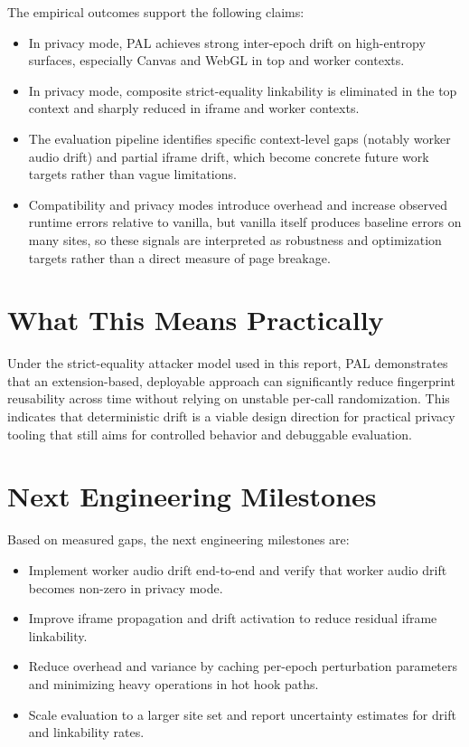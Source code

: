 \documentclass[11pt]{report}
\begin{document}
The empirical outcomes support the following claims:

\begin{itemize}
    \item In privacy mode, PAL achieves strong inter-epoch drift on high-entropy surfaces, especially Canvas and WebGL in top and worker contexts.
    \item In privacy mode, composite strict-equality linkability is eliminated in the top context and sharply reduced in iframe and worker contexts.
    \item The evaluation pipeline identifies specific context-level gaps (notably worker audio drift) and partial iframe drift, which become concrete future work targets rather than vague limitations.
    \item Compatibility and privacy modes introduce overhead and increase observed runtime errors relative to vanilla, but vanilla itself produces baseline errors on many sites, so these signals are interpreted as robustness and optimization targets rather than a direct measure of page breakage.
\end{itemize}

\section{What This Means Practically}

Under the strict-equality attacker model used in this report, PAL demonstrates that an extension-based, deployable approach can significantly reduce fingerprint reusability across time without relying on unstable per-call randomization. This indicates that deterministic drift is a viable design direction for practical privacy tooling that still aims for controlled behavior and debuggable evaluation.

\section{Next Engineering Milestones}

Based on measured gaps, the next engineering milestones are:

\begin{itemize}
    \item Implement worker audio drift end-to-end and verify that worker audio drift becomes non-zero in privacy mode.
    \item Improve iframe propagation and drift activation to reduce residual iframe linkability.
    \item Reduce overhead and variance by caching per-epoch perturbation parameters and minimizing heavy operations in hot hook paths.
    \item Scale evaluation to a larger site set and report uncertainty estimates for drift and linkability rates.
\end{itemize}
\end{document}
